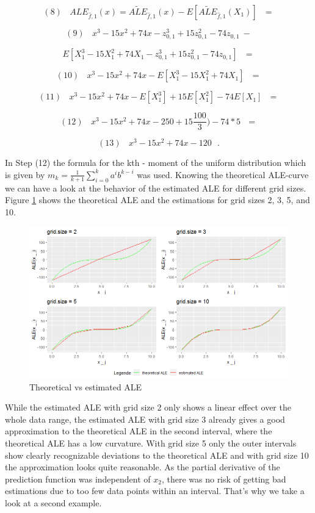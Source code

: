 \documentclass[]{krantz}
\begin{document}
\[(8)~~~~ALE_{\hat{f},1}(x) = \widetilde{ALE}_{\hat{f},1}(x) - E[\widetilde{ALE}_{\hat{f},1}(X_1)] ~~~=\]

\[(9)~~~~ x^3 - 15x^2 +74x - z_{0,1} ^ 3 + 15 z_{0,1}^2 - 74z_{0,1}  ~- \]

\[ E[X_1^3 -15X_1^2 +74X_1 - z_{0,1} ^ 3 + 15 z_{0,1}^2 - 74z_{0,1}] ~~~=\]

\[(10)~~~~ x^3 -15x^2 +74x - E[X_1^3 -15X_1^2 +74X_1] ~~~=\]

\[(11)~~~~ x^3 -15x^2 +74x - E[X_1^3] +15E[X_1^2] -74E[X_1] ~~~=\]

\[(12)~~~~ x^3 -15x^2 +74x - 250 +15 \frac{100}{3}) - 74* 5 ~~~=\]

\[(13)~~~~ x^3 -15x^2 +74x - 120~~~.\]

In Step (12) the formula for the kth - moment of the uniform
distribution which is given by
\(m_k = \frac{1}{k+1}\sum_{i=0}^k a^i b^{k-i}\) was used. Knowing the
theoretical ALE-curve we can have a look at the behavior of the
estimated ALE for different grid sizes. Figure \ref{fig:exampleALE1}
shows the theoretical ALE and the estimations for grid sizes 2, 3, 5,
and 10.

\begin{figure}
\includegraphics[width=1\linewidth]{images/ALE_2_example1_} \caption{Theoretical vs estimated ALE}\label{fig:exampleALE1}
\end{figure}



While the estimated ALE with grid size 2 only shows a linear effect over
the whole data range, the estimated ALE with grid size 3 already gives a
good approximation to the theoretical ALE in the second interval, where
the theoretical ALE has a low curvature. With grid size 5 only the outer
intervals show clearly recognizable deviations to the theoretical ALE
and with grid size 10 the approximation looks quite reasonable. As the
partial derivative of the prediction function was independent of
\(x_2\), there was no risk of getting bad estimations due to too few
data points within an interval. That's why we take a look at a second
example.
\end{document}
